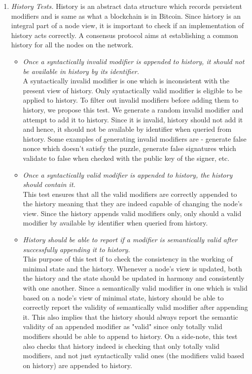 \begin{enumerate}[\IEEEsetlabelwidth{Z}]
\item \textit{History Tests.}
History is an abstract data structure which records persistent modifiers and is same as what a blockchain is in Bitcoin. Since history is an integral part of a node view, it is important to check if an implementation of history acts correctly. A consensus protocol aims at establishing a common history for all the nodes on the network.

\begin{itemize}[]
\item \textit{Once a syntactically invalid modifier is appended to history, it should not be available in history by its identifier.}\\
A syntactically invalid modifier is one which is inconsistent with the present view of history. Only syntactically valid modifier is eligible to be applied to history. To filter out invalid modifiers before adding them to history, we propose this test. We generate a random invalid modifier and attempt to add it to history. Since it is invalid, history should not add it and hence, it should not be available by identifier when queried from history. Some examples of generating invalid modifiers are - generate false nonce which doesn't satisfy the puzzle, generate false signatures which validate to false when checked with the public key of the signer, etc.

\item \textit{Once a syntactically valid modifier is appended to history, the history should contain it.}\\
This test ensures that all the valid modifiers are correctly appended to the history meaning that they are indeed capable of changing the node's view. Since the history appends valid modifiers only, only should a valid modifier by available by identifier when queried from history.

\item \textit{History should be able to report if a modifier is semantically valid after successfully appending it to history.}\\
This purpose of this test if to check the consistency in the working of minimal state and the history. Whenever a node's view is updated, both the history and the state should be updated in harmony and consistently with one another. Since a semantically valid modifier in one which is valid based on a node's view of minimal state, history should be able to correctly report the validity of semantically valid modifier after appending it. This also implies that the history should always report the semantic validity of an appended modifier as "valid" since only totally valid modifiers should be able to append to history. On a side-note, this test also checks that history indeed is checking that only totally valid modifiers, and not just syntactically valid ones (the modifiers valid based on history) are appended to history.
\end{itemize}


\end{enumerate}
